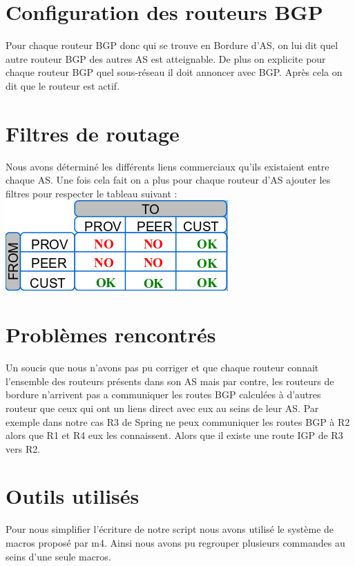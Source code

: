 \documentclass[10pt,a4paper,twocolumn]{article}
\begin{document}
\section{Configuration des routeurs BGP}
Pour chaque routeur BGP donc qui se trouve en Bordure d'AS, on lui dit quel autre routeur BGP des autres AS est atteignable. De plus on explicite pour chaque routeur BGP quel sous-réseau il doit annoncer avec BGP. Après cela on dit que le routeur est actif.
\section{Filtres de routage}
Nous avons déterminé les différents liens commerciaux qu'ils existaient entre chaque AS. Une fois cela fait on a plus pour chaque routeur d'AS ajouter les filtres pour respecter le tableau suivant : 
\includegraphics[scale=0.7]{comlink.png}
\section{Problèmes rencontrés}
Un soucis que nous n'avons pas pu corriger et que chaque routeur connait l'ensemble des routeurs présents dans son AS mais par contre, les routeurs de bordure n'arrivent pas a communiquer les routes BGP calculées à d'autres routeur que ceux qui ont un liens direct avec eux au seins de leur AS.
Par exemple dans notre cas R3 de Spring ne peux communiquer les routes BGP à R2 alors que R1 et R4 eux les connaissent. Alors que il existe une route IGP de R3 vers R2.
\section{Outils utilisés}
Pour nous simplifier l'écriture de notre script nous avons utilisé le système de macros proposé par m4.
Ainsi nous avons pu regrouper plusieurs commandes au seins d'une seule macros.
\end{document}
